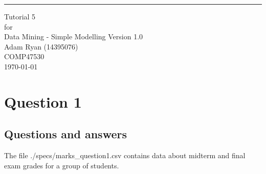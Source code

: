 \documentclass{scrreprt}
\date{}
\def\myversion{1.0}
\begin{document}
	
	\begin{flushright}
		\rule{16cm}{5pt}\vskip1cm
		\begin{bfseries}
			\Huge{Tutorial 5\\}
			\vspace{1.9cm}
			for\\
			\vspace{1.9cm}
			Data Mining - Simple Modelling
			\vspace{1.9cm}
			\LARGE{Version \myversion}\\
			\vspace{1.9cm}
			Adam Ryan (14395076)\\
			\vspace{1.9cm}
			COMP47530\\
			\vspace{1.9cm}
			\today\\
		\end{bfseries}
	\end{flushright}
	
	\tableofcontents

	
\chapter{Question 1}
\section{Questions and answers}\label{E1Q}
The file ./specs/marks\_question1.csv contains data about midterm and final exam grades for a group of students.
\end{document}
